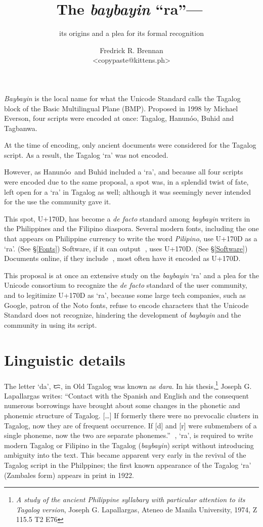 \documentclass[a4paper,pagesize,openany,14pt,parskip=never]{scrbook}
\title{The {\em baybayin} ``ra''---{\baybayin ᜍ}}
\author{Fredrick R. Brennan \\ <copypaste@kittens.ph>}
\subtitle{its origins and a plea for its formal recognition}
\newcommand{\≈}{$\approx$}
\newcommand{\ra}{{\baybayin ᜍ}}
\newcommand{\hanunoo}{Hanun\'o\textquotesingle o}
\begin{document}
\maketitle
\tableofcontents
{}
{\em Baybayin} is the local name for what the Unicode Standard calls the Tagalog block of the Basic Multilingual Plane (BMP). Proposed in 1998 by Michael Everson, four scripts were encoded at once: Tagalog, \hanunoo, Buhid and Tagbanwa.

At the time of encoding, only ancient documents were considered for the Tagalog script. As a result, the Tagalog `ra' was not encoded. 

However, as \hanunoo\ and Buhid included a `ra', and because all four scripts were encoded due to the same proposal, a spot was, in a splendid twist of fate, left open for a `ra' in Tagalog as well; although it was seemingly never intended for the use the community gave it.

This spot, U+170D, has become a {\em de facto} standard among {\em baybayin} writers in the Philippines and the Filipino diaspora. Several modern fonts, including the one that appears on Philippine currency to write the word {\em Pilipino}, use U+170D as a `ra'. (See \S\ref{Fonts}) Software, if it can output \ra, uses U+170D. (See \S\ref{Software}) Documents online, if they include \ra, most often have it encoded as U+170D.

This proposal is at once an extensive study on the {\em baybayin} `ra' and a plea for the Unicode consortium to recognize the {\em de facto} standard of the user community, and to legitimize U+170D as `ra', because some large tech companies, such as Google, patron of the Noto fonts, refuse to encode characters that the Unicode Standard does not recognize, hindering the development of {\em baybayin} and the community in using its script.

\section{Linguistic details}
The letter `da', {\baybayin ᜇ}, in Old Tagalog was known as {\em dara}. In his thesis,\footnote{{\em A study of the ancient Philippine syllabary with particular attention to its Tagalog version}, Joseph G. Lapallargas, Ateneo de Manila University, 1974, Z 115.5 T2 E76} Joseph G. Lapallargas writes: ``Contact with the Spanish and English and the consequent numerous borrowings have brought about some changes in the phonetic and phonemic structure of Tagalog. [\ldots] If formerly there were no prevocalic clusters in Tagalog, now they are of frequent occurrence. If [d] and [r] were submembers of a single phoneme, now the two are separate phonemes.'' {\baybayin ᜍ}, `ra', is required to write modern Tagalog or Filipino in the Tagalog ({\em baybayin}) script without introducing ambiguity into the text. This became apparent very early in the revival of the Tagalog script in the Philppines; the first known appearance of the Tagalog `ra' (Zambales form) appears in print in 1922.
\end{document}
